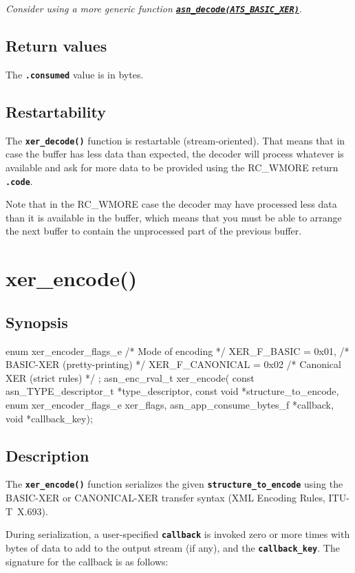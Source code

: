 \documentclass[english,oneside,12pt]{book}
\newcommand{\apisection}[2]{\clearpage\section{\label{#1}#2}}
\newcommand{\api}[2]{\hyperref[#1]{\code{#2}}}
\newcommand{\code}[1]{\texttt{\textbf{\lstinline{#1}}}}
\begin{document}
\noindent\emph{Consider using a more generic function \api{sec:asn_decode}{asn_decode(ATS_BASIC_XER)}.}

\subsection*{Return values}


The \code{.consumed} value is in bytes.

\subsection*{Restartability}

The \code{xer_decode()} function is restartable (stream-oriented).
That means that in case the buffer has less data than expected,
the decoder will process whatever is available and ask for more data
to be provided using the RC\_WMORE return \code{.code}.

Note that in the RC\_WMORE case the decoder may have processed less data than
it is available in the buffer, which means that you must be able to arrange
the next buffer to contain the unprocessed part of the previous buffer.

\apisection{sec:xer_encode}{xer\_encode()}

\subsection*{Synopsis}

\begin{signature}
enum xer_encoder_flags_e {
    /* Mode of encoding */
    XER_F_BASIC     = 0x01, /* BASIC-XER (pretty-printing) */
    XER_F_CANONICAL = 0x02  /* Canonical XER (strict rules) */
};
asn_enc_rval_t xer_encode(
    const asn_TYPE_descriptor_t *type_descriptor,
    const void *structure_to_encode,
    enum xer_encoder_flags_e xer_flags,
    asn_app_consume_bytes_f *callback,
    void *callback_key);
\end{signature}

\subsection*{Description}

The \code{xer_encode()} function serializes the given \code{structure_to_encode} using the BASIC-XER or CANONICAL-XER transfer syntax (XML Encoding Rules, ITU-T~X.693).

During serialization, a user-specified \code{callback} is invoked zero
or more times with bytes of data to add to the output stream (if any), and
the \code{callback_key}. The signature for the callback is as follows:
\end{document}
